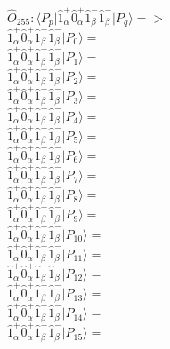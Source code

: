 \documentclass[14pt]{article}
\begin{document}
    $\hat{O}_{255}:  \langle{P_p}\vert \hat{1}_{\alpha}^{+}\hat{0}_{\alpha}^{+}\hat{1}_{\beta}^{-}\hat{1}_{\beta}^{-} \vert{P_q}\rangle => $ \\ 
    $ \hat{1}_{\alpha}^{+}\hat{0}_{\alpha}^{+}\hat{1}_{\beta}^{-}\hat{1}_{\beta}^{-} \vert{P_{0}}\rangle =  $ \\ 
    $ \hat{1}_{\alpha}^{+}\hat{0}_{\alpha}^{+}\hat{1}_{\beta}^{-}\hat{1}_{\beta}^{-} \vert{P_{1}}\rangle =  $ \\ 
    $ \hat{1}_{\alpha}^{+}\hat{0}_{\alpha}^{+}\hat{1}_{\beta}^{-}\hat{1}_{\beta}^{-} \vert{P_{2}}\rangle =  $ \\ 
    $ \hat{1}_{\alpha}^{+}\hat{0}_{\alpha}^{+}\hat{1}_{\beta}^{-}\hat{1}_{\beta}^{-} \vert{P_{3}}\rangle =  $ \\ 
    $ \hat{1}_{\alpha}^{+}\hat{0}_{\alpha}^{+}\hat{1}_{\beta}^{-}\hat{1}_{\beta}^{-} \vert{P_{4}}\rangle =  $ \\ 
    $ \hat{1}_{\alpha}^{+}\hat{0}_{\alpha}^{+}\hat{1}_{\beta}^{-}\hat{1}_{\beta}^{-} \vert{P_{5}}\rangle =  $ \\ 
    $ \hat{1}_{\alpha}^{+}\hat{0}_{\alpha}^{+}\hat{1}_{\beta}^{-}\hat{1}_{\beta}^{-} \vert{P_{6}}\rangle =  $ \\ 
    $ \hat{1}_{\alpha}^{+}\hat{0}_{\alpha}^{+}\hat{1}_{\beta}^{-}\hat{1}_{\beta}^{-} \vert{P_{7}}\rangle =  $ \\ 
    $ \hat{1}_{\alpha}^{+}\hat{0}_{\alpha}^{+}\hat{1}_{\beta}^{-}\hat{1}_{\beta}^{-} \vert{P_{8}}\rangle =  $ \\ 
    $ \hat{1}_{\alpha}^{+}\hat{0}_{\alpha}^{+}\hat{1}_{\beta}^{-}\hat{1}_{\beta}^{-} \vert{P_{9}}\rangle =  $ \\ 
    $ \hat{1}_{\alpha}^{+}\hat{0}_{\alpha}^{+}\hat{1}_{\beta}^{-}\hat{1}_{\beta}^{-} \vert{P_{10}}\rangle =  $ \\ 
    $ \hat{1}_{\alpha}^{+}\hat{0}_{\alpha}^{+}\hat{1}_{\beta}^{-}\hat{1}_{\beta}^{-} \vert{P_{11}}\rangle =  $ \\ 
    $ \hat{1}_{\alpha}^{+}\hat{0}_{\alpha}^{+}\hat{1}_{\beta}^{-}\hat{1}_{\beta}^{-} \vert{P_{12}}\rangle =  $ \\ 
    $ \hat{1}_{\alpha}^{+}\hat{0}_{\alpha}^{+}\hat{1}_{\beta}^{-}\hat{1}_{\beta}^{-} \vert{P_{13}}\rangle =  $ \\ 
    $ \hat{1}_{\alpha}^{+}\hat{0}_{\alpha}^{+}\hat{1}_{\beta}^{-}\hat{1}_{\beta}^{-} \vert{P_{14}}\rangle =  $ \\ 
    $ \hat{1}_{\alpha}^{+}\hat{0}_{\alpha}^{+}\hat{1}_{\beta}^{-}\hat{1}_{\beta}^{-} \vert{P_{15}}\rangle =  $ \\ 
    
\end{document}
